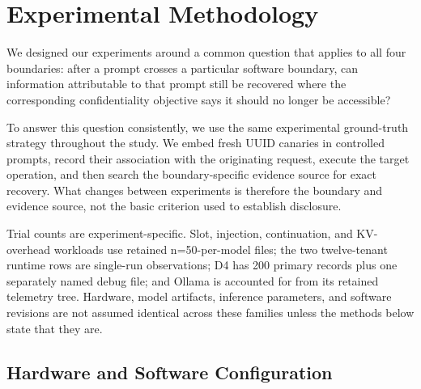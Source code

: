 

\section{Experimental Methodology}
\label{app:methodology}

We designed our experiments around a common question that applies to all
four boundaries: after a prompt crosses a particular software boundary,
can information attributable to that prompt still be recovered where the
corresponding confidentiality objective says it should no longer be
accessible?

To answer this question consistently, we use the same experimental
ground-truth strategy throughout the study. We embed fresh UUID canaries
in controlled prompts, record their association with the originating
request, execute the target operation, and then search the
boundary-specific evidence source for exact recovery. What changes
between experiments is therefore the boundary and evidence source, not
the basic criterion used to establish disclosure.

Trial counts are experiment-specific. Slot, injection, continuation, and
KV-overhead workloads use retained n=50-per-model files; the two
twelve-tenant runtime rows are single-run observations; D4 has 200 primary
records plus one separately named debug file; and Ollama is accounted for
from its retained telemetry tree. Hardware, model artifacts, inference
parameters, and software revisions are not assumed identical across these
families unless the methods below state that they are.


\subsection{Hardware and Software Configuration}
\label{app:hardware}

